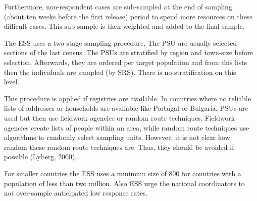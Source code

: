 Furthermore, non-respondent cases are sub-sampled at the end of sampling (about ten weeks before the first release) period to spend more resources on these difficult cases. This sub-sample is then weighted and added to the final sample.
\begin{table}[H]
\centering
{}
    \caption{Comparison of ESS and GSS}
    \label{ESScomp}
\end{table}

The ESS uses a two-stage sampling procedure. The PSU are usually selected sections of the last census. The PSUs are stratified by region and town-size before selection. Afterwards, they are ordered per target population and from this lists then the individuals are sampled (by SRS). There is no stratification on this level. 

This procedure is applied if registries are available. In countries where no reliable lists of addresses or households are available like Portugal or Bulgaria, PSUs are used but then use fieldwork agencies or random route techniques. Fieldwork agencies create lists of people within an area, while random route techniques use algorithms to randomly select sampling units. However, it is not clear how random these random route techniques are. Thus, they should be avoided if possible (Lyberg, 2000).

For smaller countries the ESS uses a minimum size of 800 for countries with a population of less than two million. Also ESS urge the national coordinators to not over-sample anticipated low response rates.
